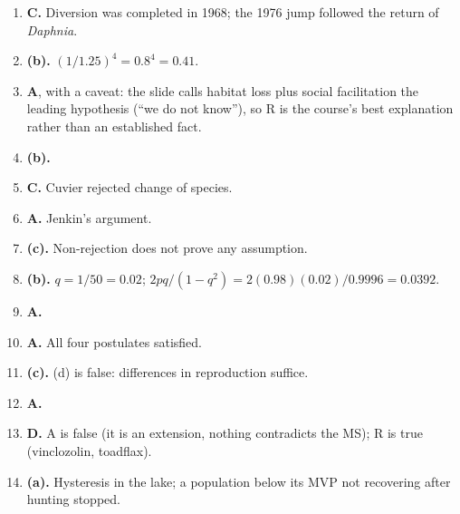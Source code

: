 \begin{enumerate}[label=\textbf{Q\arabic*.},leftmargin=2.6em]
\item \textbf{C.} Diversion was completed in 1968; the 1976 jump followed the return of \emph{Daphnia}.
\item \textbf{(b).} $(1/1.25)^4=0.8^4=0.41$.
\item \textbf{A}, with a caveat: the slide calls habitat loss plus social facilitation the leading hypothesis (``we do
not know''), so R is the course's best explanation rather than an established fact.
\item \textbf{(b).}
\item \textbf{C.} Cuvier rejected change of species.
\item \textbf{A.} Jenkin's argument.
\item \textbf{(c).} Non-rejection does not prove any assumption.
\item \textbf{(b).} $q=1/50=0.02$; $2pq/(1-q^2)=2(0.98)(0.02)/0.9996=0.0392$.
\item \textbf{A.}
\item \textbf{A.} All four postulates satisfied.
\item \textbf{(c).} (d) is false: differences in reproduction suffice.
\item \textbf{A.}
\item \textbf{D.} A is false (it is an extension, nothing contradicts the MS); R is true (vinclozolin, toadflax).
\item \textbf{(a).} Hysteresis in the lake; a population below its MVP not recovering after hunting stopped.
\end{enumerate}

